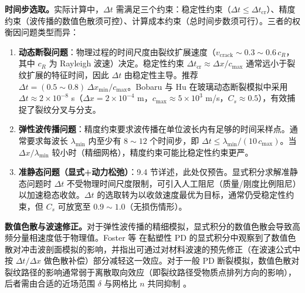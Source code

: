 \textbf{时间步选取。}实际计算中，$\Delta t$ 需满足三个约束：稳定性约束（$\Delta t\le\Delta t_{\text{cr}}$）、精度约束（波传播的数值色散须可控）、计算成本约束（总时间步数须可行）。三者的权衡因问题类型而异：

\begin{enumerate}[label=(\arabic*), leftmargin=*]
  \item \textbf{动态断裂问题}：物理过程的时间尺度由裂纹扩展速度（$v_{\text{crack}}\sim0.3\sim0.6\,c_R$，其中 $c_R$ 为 Rayleigh 波速）决定。稳定性约束 $\Delta t_{\text{cr}}\approx\Delta x/c_{\max}$ 通常远小于裂纹扩展的特征时间，因此 $\Delta t$ 由稳定性主导。推荐 $\Delta t = (0.5\sim0.8)\,\Delta x_{\min}/c_{\max}$。Bobaru 与 Hu \cite{BobaruHu2012} 在玻璃动态断裂模拟中采用 $\Delta t\approx2\times10^{-8}$ s（$\Delta x=2\times10^{-4}$ m，$c_{\max}\approx5\times10^{3}$ m/s，$C_s\approx0.5$），有效捕捉了裂纹分叉与分支。
  \item \textbf{弹性波传播问题}：精度约束要求波传播在单位波长内有足够的时间采样点。通常要求每波长 $\lambda_{\min}$ 内至少有 $8\sim12$ 个时间步，即 $\Delta t\le\lambda_{\min}/(10\,c_{\max})$。当 $\Delta x/\lambda_{\min}$ 较小时（精细网格），精度约束可能比稳定性约束更严。
  \item \textbf{准静态问题（显式+动力松弛）}：9.4 节详述，此处仅预告。显式积分求解准静态问题时 $\Delta t$ 不受物理时间尺度限制，可引入人工阻尼（质量/刚度比例阻尼）以加速稳态收敛。$\Delta t$ 的选取转为以收敛速度最优为目标，通常仍受稳定性约束，但 $C_s$ 可放宽至 $0.9\sim1.0$（无损伤情形）。
\end{enumerate}

\textbf{数值色散与波速修正。}对于弹性波传播的精细模拟，显式积分的数值色散会导致高频分量相速度低于物理值。Foster 等 \cite{Foster2010} 在黏塑性 PD 的显式积分中观察到了数值色散对冲击波剖面模拟的影响，并指出可通过对材料波速的预先修正（在波速公式中按 $\Delta t/\Delta x$ 做色散补偿）部分减轻这一效应。对于一般 PD 断裂模拟，数值色散对裂纹路径的影响通常弱于离散取向效应（即裂纹路径受物质点排列方向的影响），后者需由合适的近场范围 $\delta$ 与网格比 $n$ 共同抑制 \cite{HaBobaru2010,Diehl2019}。

